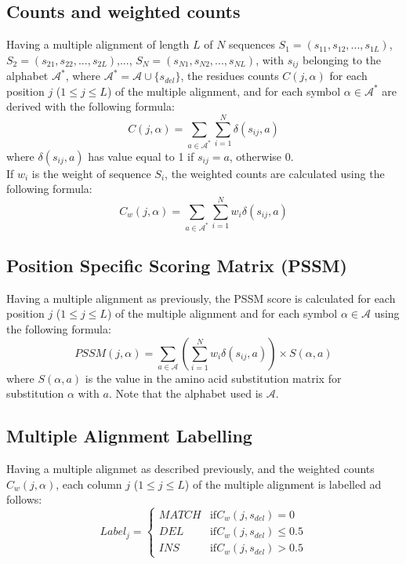 \documentclass[a4paper,10pt,twoside]{scrartcl}
\begin{document}
\subsection{Counts and weighted counts}

Having a multiple alignment of length $L$ of $N$ sequences $S_1 = (s_{11},s_{12},...,s_{1L})$, $S_2 = (s_{21},s_{22},...,s_{2L})$,..., $S_N = (s_{N1},s_{N2},...,s_{NL})$,
with $s_{ij}$ belonging to the alphabet $\mathcal{A}^{*}$, where $\mathcal{A}^{*} = \mathcal{A} \cup \{s_{del}\}$, the residues counts $C(j,\alpha)$ for each position
$j$ ($1 \le j \le L$) of the multiple alignment, and for each symbol $\alpha \in \mathcal{A}^{*}$ are derived with the following formula:
\begin{equation}
C(j,\alpha) = \sum_{a \in \mathcal{A}^{*}}\sum_{i=1}^{N}\delta(s_{ij},a)
\end{equation}
where $\delta(s_{ij},a)$ has value equal to 1 if $s_{ij} = a$, otherwise $0$.\\
If $w_i$ is the weight of sequence $S_i$, the weighted counts are calculated using the following formula:
\begin{equation}
C_w(j,\alpha) = \sum_{a \in \mathcal{A}^{*}}\sum_{i=1}^{N}w_i\delta(s_{ij},a)
\end{equation}

\subsection{Position Specific Scoring Matrix (PSSM)}
Having a multiple alignment as previously, the PSSM score is calculated for each position $j$ ($1 \le j \le L$) of the multiple alignment and for each symbol $\alpha \in \mathcal{A}$
using the following formula:
\begin{equation}
PSSM(j,\alpha) = \sum_{a \in \mathcal{A}}(\sum_{i=1}^{N}w_i\delta(s_{ij},a)) \times S(\alpha,a)
\end{equation}
where $S(\alpha,a)$ is the value in the amino acid substitution matrix for substitution $\alpha$ with $a$. Note that the alphabet used is $\mathcal{A}$.

\subsection{Multiple Alignment Labelling}
Having a multiple alignmet as described previously, and the weighted counts $C_w(j,\alpha)$, each column $j$ ($1 \le j \le L$) of the multiple alignment is labelled ad follows:
\begin{equation}
Label_j = \left\{ \begin{array}{ll} 
					MATCH& \mathrm{if } C_w(j,s_{del}) = 0\\ 
					DEL&   \mathrm{if } C_w(j,s_{del}) \leq 0.5\\
					INS&   \mathrm{if } C_w(j,s_{del}) > 0.5
				   \end{array} \right. 
\end{equation}
\end{document}
